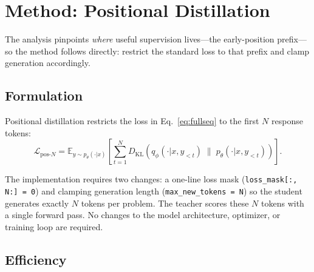\documentclass[10pt]{article}
\begin{document}
\section{Method: Positional Distillation}
\label{sec:method}

The analysis pinpoints \emph{where} useful supervision lives---the early-position prefix---so the method follows directly: restrict the standard loss to that prefix and clamp generation accordingly.

\subsection{Formulation}

Positional distillation restricts the loss in Eq.~\ref{eq:fullseq} to the first $N$ response tokens:
\begin{equation}
\mathcal{L}_{\text{pos-}N} = \mathbb{E}_{y \sim p_\theta(\cdot|x)} \left[ \sum_{t=1}^{N} D_\mathrm{KL}\!\left( q_\phi(\cdot | x, y_{<t}) \;\|\; p_\theta(\cdot | x, y_{<t}) \right) \right].
\label{eq:pos}
\end{equation}

The implementation requires two changes: a one-line loss mask (\texttt{loss\_mask[:, N:] = 0}) and clamping generation length (\texttt{max\_new\_tokens = N}) so the student generates exactly $N$ tokens per problem.
The teacher scores these $N$ tokens with a single forward pass.
No changes to the model architecture, optimizer, or training loop are required.

\subsection{Efficiency}
\end{document}

